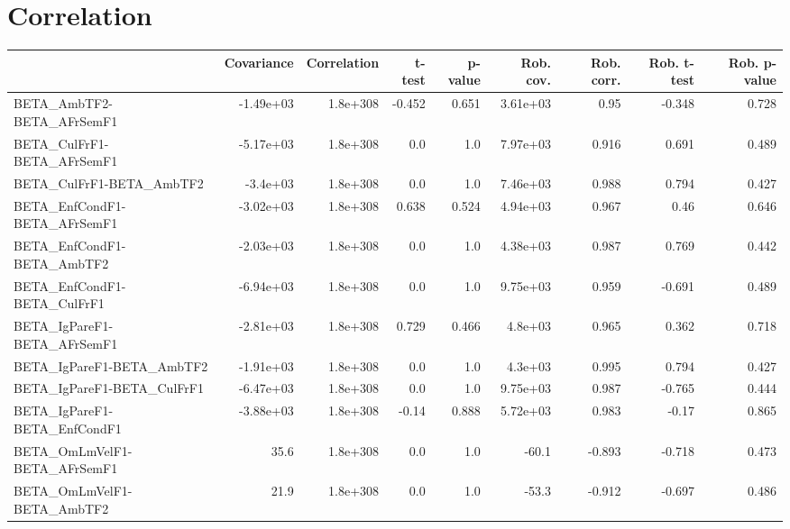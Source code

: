 \section{Correlation}
\begin{tabular}{lrrrrrrrr}
\toprule
{} &  Covariance &  Correlation &  t-test &  p-value &  Rob. cov. &  Rob. corr. &  Rob. t-test &  Rob. p-value \\
\midrule
BETA\_AmbTF2-BETA\_AFrSemF1             &   -1.49e+03 &     1.8e+308 &  -0.452 &    0.651 &   3.61e+03 &        0.95 &       -0.348 &         0.728 \\
BETA\_CulFrF1-BETA\_AFrSemF1            &   -5.17e+03 &     1.8e+308 &     0.0 &      1.0 &   7.97e+03 &       0.916 &        0.691 &         0.489 \\
BETA\_CulFrF1-BETA\_AmbTF2              &    -3.4e+03 &     1.8e+308 &     0.0 &      1.0 &   7.46e+03 &       0.988 &        0.794 &         0.427 \\
BETA\_EnfCondF1-BETA\_AFrSemF1          &   -3.02e+03 &     1.8e+308 &   0.638 &    0.524 &   4.94e+03 &       0.967 &         0.46 &         0.646 \\
BETA\_EnfCondF1-BETA\_AmbTF2            &   -2.03e+03 &     1.8e+308 &     0.0 &      1.0 &   4.38e+03 &       0.987 &        0.769 &         0.442 \\
BETA\_EnfCondF1-BETA\_CulFrF1           &   -6.94e+03 &     1.8e+308 &     0.0 &      1.0 &   9.75e+03 &       0.959 &       -0.691 &         0.489 \\
BETA\_IgPareF1-BETA\_AFrSemF1           &   -2.81e+03 &     1.8e+308 &   0.729 &    0.466 &    4.8e+03 &       0.965 &        0.362 &         0.718 \\
BETA\_IgPareF1-BETA\_AmbTF2             &   -1.91e+03 &     1.8e+308 &     0.0 &      1.0 &    4.3e+03 &       0.995 &        0.794 &         0.427 \\
BETA\_IgPareF1-BETA\_CulFrF1            &   -6.47e+03 &     1.8e+308 &     0.0 &      1.0 &   9.75e+03 &       0.987 &       -0.765 &         0.444 \\
BETA\_IgPareF1-BETA\_EnfCondF1          &   -3.88e+03 &     1.8e+308 &   -0.14 &    0.888 &   5.72e+03 &       0.983 &        -0.17 &         0.865 \\
BETA\_OmLmVelF1-BETA\_AFrSemF1          &        35.6 &     1.8e+308 &     0.0 &      1.0 &      -60.1 &      -0.893 &       -0.718 &         0.473 \\
BETA\_OmLmVelF1-BETA\_AmbTF2            &        21.9 &     1.8e+308 &     0.0 &      1.0 &      -53.3 &      -0.912 &       -0.697 &         0.486 \\

\end{tabular}
